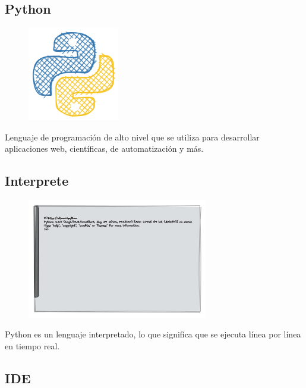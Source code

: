 \documentclass[
  a4paper,
  DIV=11,
  numbers=noendperiod,
  onepage,
  openany]{scrreprt}
\begin{document}
\subsection{Python}\label{python}

\begin{figure}

{\centering \includegraphics[width=1.5625in,height=\textheight]{unidades/unidad1/images/python.png}

}

\end{figure}

Lenguaje de programación de alto nivel que se utiliza para desarrollar
aplicaciones web, científicas, de automatización y más.

\subsection{Interprete}\label{interprete}

\begin{figure}

{\centering \includegraphics{unidades/unidad1/images/interprete.png}

}

\end{figure}

Python es un lenguaje interpretado, lo que significa que se ejecuta
línea por línea en tiempo real.

\subsection{IDE}\label{ide}
\end{document}
